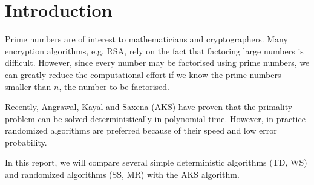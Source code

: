\section{Introduction}

Prime numbers are of interest to mathematicians and cryptographers.
Many encryption algorithms, e.g. RSA, rely on the fact that factoring large numbers is difficult.
However, since every number may be factorised using prime numbers,
we can greatly reduce the computational effort if we know the prime numbers smaller than $n$, the number to be factorised.

Recently, Angrawal, Kayal and Saxena (AKS) \cite{AKS} have proven that the primality problem can be solved deterministically in polynomial time.
However, in practice randomized algorithms are preferred because of their speed and low error probability.

In this report, we will compare several simple deterministic algorithms (TD, WS) and randomized algorithms (SS, MR) with the AKS algorithm.



% 
% 
